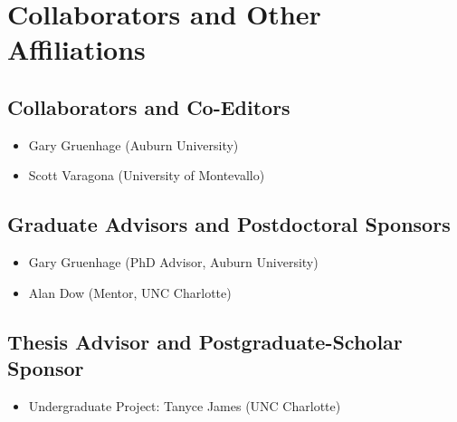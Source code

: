 
\section{Collaborators and Other Affiliations}

\subsection{Collaborators and Co-Editors}
\begin{itemize}
  \item Gary Gruenhage (Auburn University)
  \item Scott Varagona (University of Montevallo)
\end{itemize}
\subsection{Graduate Advisors and Postdoctoral Sponsors}
\begin{itemize}
  \item Gary Gruenhage (PhD Advisor, Auburn University)
  \item Alan Dow (Mentor, UNC Charlotte)
\end{itemize}
\subsection{Thesis Advisor and Postgraduate-Scholar Sponsor}
\begin{itemize}
  \item Undergraduate Project: Tanyce James (UNC Charlotte)
\end{itemize}





\newpage

\setcounter{section}{0}


